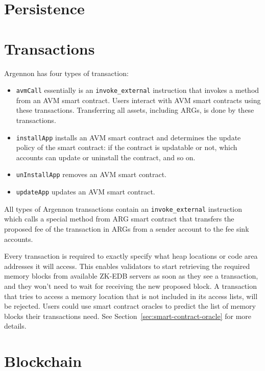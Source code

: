 

\section{Persistence}\label{sec:persistence}


\section{Transactions}\label{sec:transactions}

Argennon has four types of transaction:

\begin{itemize}
    \item \texttt{avmCall} essentially is an \texttt{invoke\_external} instruction that invokes a method from an
    AVM smart contract. Users interact with AVM smart contracts using these transactions. Transferring all
    assets, including ARGs, is done by these transactions.
    \item \texttt{installApp} installs an AVM smart contract and determines the update policy of the smart
    contract: if the contract is updatable or not, which accounts can update or uninstall the contract, and so
    on.
    \item \texttt{unInstallApp} removes an AVM smart contract.
    \item \texttt{updateApp} updates an AVM smart contract.
\end{itemize}

All types of Argennon transactions contain an \texttt{invoke\_external} instruction which calls a special method
from ARG smart contract that transfers the proposed fee of the transaction in ARGs from a sender account to the
fee sink accounts.

Every transaction is required to exactly specify what heap locations or code area addresses it will access. This
enables validators to start retrieving the required memory blocks from available ZK-EDB servers as soon as they
see a transaction, and they won't need to wait for receiving the new proposed block. A transaction that tries to
access a memory location that is not included in its access lists, will be rejected. Users could use smart contract
oracles to predict the list of memory blocks their transactions need. See Section~\ref{sec:smart-contract-oracle}
for more details.


\section{Blockchain}\label{sec:blockchain}

